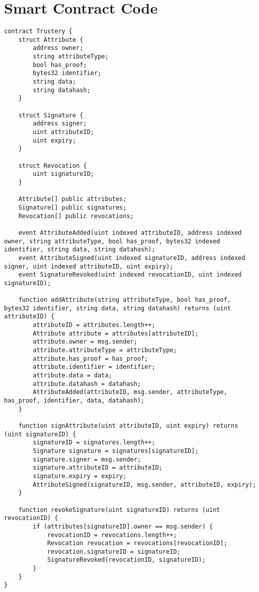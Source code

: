 \documentclass[12pt,a4paper]{report}
\begin{document}
	\chapter{Smart Contract Code}
	\begin{lstlisting}
contract Trustery {
    struct Attribute {
        address owner;
        string attributeType;
        bool has_proof;
        bytes32 identifier;
        string data;
        string datahash;
    }

    struct Signature {
        address signer;
        uint attributeID;
        uint expiry;
    }

    struct Revocation {
        uint signatureID;
    }

    Attribute[] public attributes;
    Signature[] public signatures;
    Revocation[] public revocations;

    event AttributeAdded(uint indexed attributeID, address indexed owner, string attributeType, bool has_proof, bytes32 indexed identifier, string data, string datahash);
    event AttributeSigned(uint indexed signatureID, address indexed signer, uint indexed attributeID, uint expiry);
    event SignatureRevoked(uint indexed revocationID, uint indexed signatureID);

    function addAttribute(string attributeType, bool has_proof, bytes32 identifier, string data, string datahash) returns (uint attributeID) {
        attributeID = attributes.length++;
        Attribute attribute = attributes[attributeID];
        attribute.owner = msg.sender;
        attribute.attributeType = attributeType;
        attribute.has_proof = has_proof;
        attribute.identifier = identifier;
        attribute.data = data;
        attribute.datahash = datahash;
        AttributeAdded(attributeID, msg.sender, attributeType, has_proof, identifier, data, datahash);
    }

    function signAttribute(uint attributeID, uint expiry) returns (uint signatureID) {
        signatureID = signatures.length++;
        Signature signature = signatures[signatureID];
        signature.signer = msg.sender;
        signature.attributeID = attributeID;
        signature.expiry = expiry;
        AttributeSigned(signatureID, msg.sender, attributeID, expiry);
    }

    function revokeSignature(uint signatureID) returns (uint revocationID) {
        if (attributes[signatureID].owner == msg.sender) {
            revocationID = revocations.length++;
            Revocation revocation = revocations[revocationID];
            revocation.signatureID = signatureID;
            SignatureRevoked(revocationID, signatureID);
        }
    }
}
	\end{lstlisting}
\end{document}

